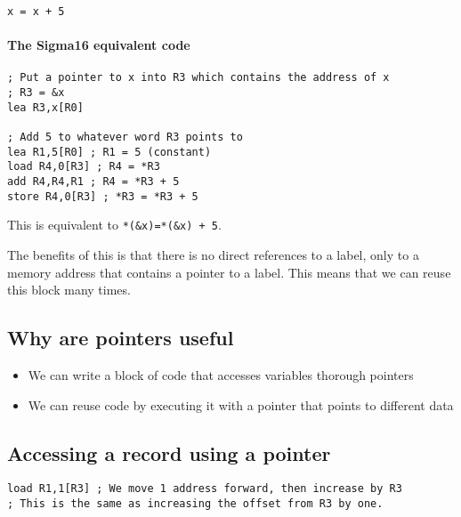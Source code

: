 \begin{verbatim}
x = x + 5
\end{verbatim}

\paragraph{The Sigma16 equivalent code}\label{par:the_sigma16_equivalent_code}

\begin{verbatim}
; Put a pointer to x into R3 which contains the address of x
; R3 = &x
lea R3,x[R0]

; Add 5 to whatever word R3 points to
lea R1,5[R0] ; R1 = 5 (constant)
load R4,0[R3] ; R4 = *R3
add R4,R4,R1 ; R4 = *R3 + 5
store R4,0[R3] ; *R3 = *R3 + 5
\end{verbatim}

\begin{note}
	This is equivalent to \texttt{*(&x)=*(&x) + 5}.
\end{note}
The benefits of this is that there is no direct references to a label, only to a memory address that contains a pointer to a label.
This means that we can reuse this block many times.

\subsection{Why are pointers useful}\label{sub:why_are_pointers_useful}

\begin{itemize}
	\item We can write a block of code that accesses variables thorough pointers
	\item We can reuse code by executing it with a pointer that points to different data
\end{itemize}

\subsection{Accessing a record using a pointer}\label{sub:accessing_a_record_using_a_pointer}

\begin{verbatim}
load R1,1[R3] ; We move 1 address forward, then increase by R3
; This is the same as increasing the offset from R3 by one.
\end{verbatim}

